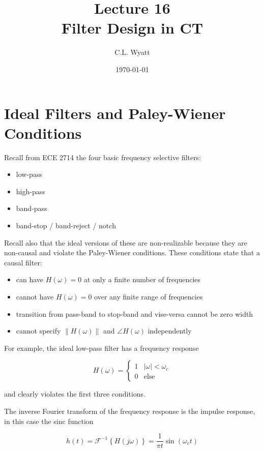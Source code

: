 \documentclass{article}
\begin{document}
\title{Lecture 16\\Filter Design in CT}
\author{C.L. Wyatt}
\date{\today}
\maketitle

\section{Ideal Filters and Paley-Wiener Conditions}

Recall from ECE 2714 the four basic frequency selective filters:

\begin{itemize}
\item low-pass
\item high-pass
\item band-pass
\item band-stop / band-reject / notch
\end{itemize}

Recall also that the ideal versions of these are non-realizable because they are non-causal and violate the Paley-Wiener conditions. These conditions state that a causal filter:

\begin{itemize}
\item can have $H(\omega) = 0$ at only a finite number of frequencies
\item cannot have $H(\omega) = 0$ over any finite range of frequencies
\item transition from pass-band to stop-band and vise-versa cannot be zero width
\item cannot specify $\|H(\omega)\|$ and $\angle H(\omega)$ independently
\end{itemize}

For example, the ideal low-pass filter has a frequency response

\[
H(\omega) = \left\{ \begin{array}{cc}
  1 & |\omega| < \omega_c\\
  0 & \text{else}
\end{array}
\right.
\]

and clearly violates the first three conditions.

The inverse Fourier transform of the frequency response is the impulse response, in this case the sinc function

\[
h(t) = \mathcal{F}^{-1}\left\{H(j\omega)\right\} = \frac{1}{\pi t}\sin(\omega_c t)
\]
\end{document}
